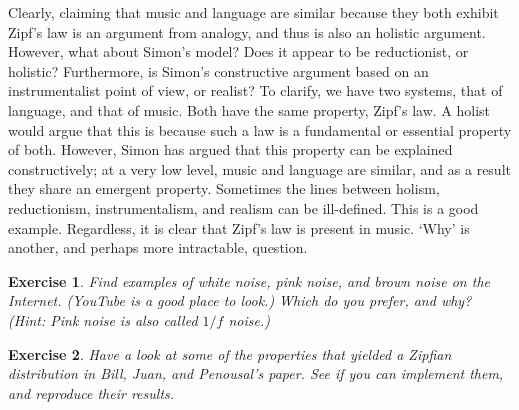 \documentclass[10pt]{book}
\newtheorem{exercise}{Exercise}[chapter]
\begin{document}
Clearly, claiming that music and language are similar because they both exhibit Zipf's law is an argument from analogy, and thus is also an holistic argument. However, what about Simon's model? Does it appear to be reductionist, or holistic? Furthermore, is Simon's constructive argument based on an instrumentalist point of view, or realist? To clarify, we have two systems, that of language, and that of music. Both have the same property, Zipf's law. A holist would argue that this is because such a law is a fundamental or essential property of both. However, Simon has argued that this property can be explained constructively; at a very low level, music and language are similar, and as a result they share an emergent property. Sometimes the lines between holism, reductionism, instrumentalism, and realism can be ill-defined. This is a good example. Regardless, it is clear that Zipf's law is present in music. `Why' is another, and perhaps more intractable, question.

\begin{exercise}
Find examples of white noise, pink noise, and brown noise on the Internet. (YouTube is a good place to look.) Which do you prefer, and why? (Hint: Pink noise is also called $1/f$ noise.)
\end{exercise}

\begin{exercise}
Have a look at some of the properties that yielded a Zipfian distribution in Bill, Juan, and Penousal's paper. See if you can implement them, and reproduce their results.
\end{exercise}
\end{document}
